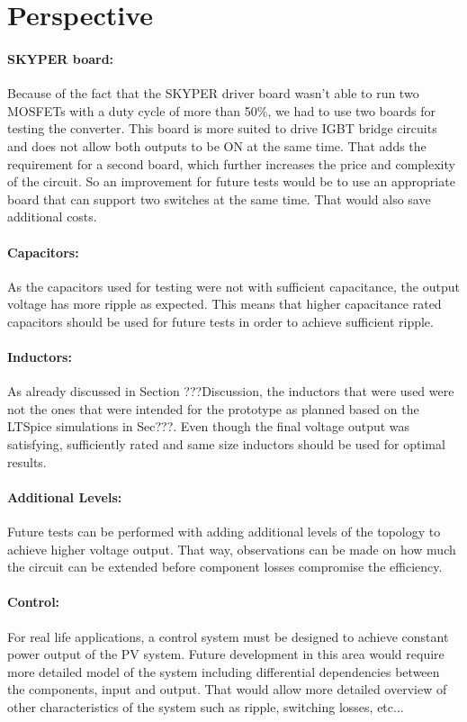 \chapter{Perspective}\label{ch:perspective}

\subsubsection{SKYPER board:}
Because of the fact that the SKYPER driver board wasn't able to run two MOSFETs with a duty cycle of more than 50\%, we had to use two boards for testing the converter. This board is more suited to drive IGBT bridge circuits and does not allow both outputs to be ON at the same time. That adds the requirement for a second board, which further increases the price and complexity of the circuit.
So an improvement for future tests would be to use an appropriate board that can support two switches at the same time. That would also save additional costs.

\subsubsection{Capacitors:}
As the capacitors used for testing were not with sufficient capacitance, the output voltage has more ripple as expected. This means that higher capacitance rated capacitors should be used for future tests in order to achieve sufficient ripple.

\subsubsection{Inductors:}
As already discussed in Section ???Discussion, the inductors that were used
were not the ones that were intended for the prototype as planned based on the LTSpice simulations in Sec???. Even though the final voltage output was satisfying, sufficiently rated and same size inductors should be used for optimal results.

\subsubsection{Additional Levels:}
Future tests can be performed with adding additional levels of the topology to achieve higher voltage output. That way, observations can be made on how much the circuit can be extended before component losses compromise the efficiency. 

\subsubsection{Control:}
For real life applications, a control system must be designed to achieve constant power output of the PV system. Future development in this area would require more detailed model of the system including differential dependencies between the components, input and output. That would allow more detailed overview of other characteristics of the system such as ripple, switching losses, etc...

